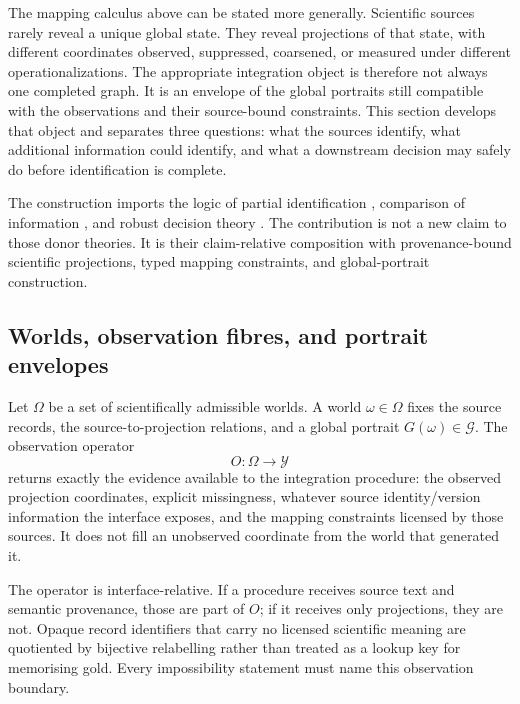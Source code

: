 
The mapping calculus above can be stated more generally. Scientific sources
rarely reveal a unique global state. They reveal projections of that state,
with different coordinates observed, suppressed, coarsened, or measured under
different operationalizations. The appropriate integration object is
therefore not always one completed graph. It is an envelope of the global
portraits still compatible with the observations and their source-bound
constraints. This section develops that object and separates three questions:
what the sources identify, what additional information could identify, and
what a downstream decision may safely do before identification is complete.

The construction imports the logic of partial identification
\cite{manski2003partial,tamer2010partial}, comparison of information
\cite{blackwell1953equivalent}, and robust decision theory
\cite{berger1985decision,walley1991imprecise}. The contribution is not a new
claim to those donor theories. It is their claim-relative composition with
provenance-bound scientific projections, typed mapping constraints, and
global-portrait construction.

\subsection{Worlds, observation fibres, and portrait envelopes}

Let $\Omega$ be a set of scientifically admissible worlds. A world
$\omega\in\Omega$ fixes the source records, the source-to-projection
relations, and a global portrait $G(\omega)\in\mathcal G$. The observation
operator
\begin{equation}
  O:\Omega\longrightarrow\mathcal Y
\end{equation}
returns exactly the evidence available to the integration procedure: the
observed projection coordinates, explicit missingness, whatever source
identity/version information the interface exposes, and the mapping
constraints licensed by those sources. It does not fill an unobserved
coordinate from the world that generated it.

The operator is interface-relative. If a procedure receives source text and
semantic provenance, those are part of $O$; if it receives only projections,
they are not. Opaque record identifiers that carry no licensed scientific
meaning are quotiented by bijective relabelling rather than treated as a
lookup key for memorising gold. Every impossibility statement must name this
observation boundary.

